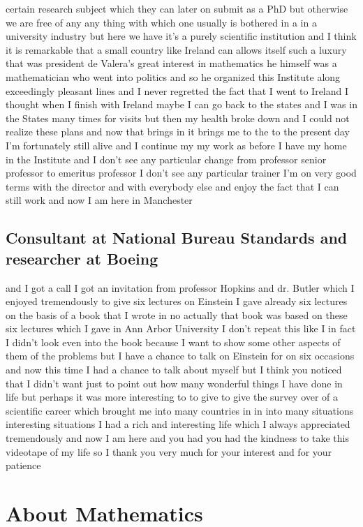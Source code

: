 \documentclass{article}
\begin{document}
certain research subject which they can later on submit as a PhD but otherwise we are free of any any thing with which one usually is bothered in a in a university industry but here we have it's a purely scientific institution and I think it is remarkable that a small country like Ireland can allows itself such a luxury that was president de Valera's great interest in mathematics he himself was a mathematician who went into politics and so he organized this Institute along exceedingly pleasant lines and I never regretted the fact that I went to Ireland I thought when I finish with Ireland maybe I can go back to the states and I was in the States many times for visits but then my health broke down and I could not realize these plans and now that brings in it brings me to the to the present day I'm fortunately still alive and I continue my my work as before I have my home in the Institute and I don't see any particular change from professor senior professor to emeritus professor I don't see any particular trainer I'm on very good terms with the director and with everybody else and enjoy the fact that I can still work and now I am here in Manchester

\subsection{Consultant at National Bureau Standards and researcher at Boeing}
and I got a call I got an invitation from professor Hopkins and dr. Butler which I enjoyed tremendously to give six lectures on Einstein I gave already six lectures on the basis of a book that I wrote in no actually that book was based on these six lectures which I gave in Ann Arbor University I don't repeat this like I in fact I didn't look even into the book because I want to show some other aspects of them of the problems but I have a chance to talk on Einstein for on six occasions and now this time I had a chance to talk about myself but I think you noticed that I didn't want just to point out how many wonderful things I have done in life but perhaps it was more interesting to to give to give the survey over of a scientific career which brought me into many countries in in into many situations interesting situations I had a rich and interesting life which I always appreciated tremendously and now I am here and you had you had the kindness to take this videotape of my life so I thank you very much for your interest and for your patience


\section{About Mathematics}
\end{document}
